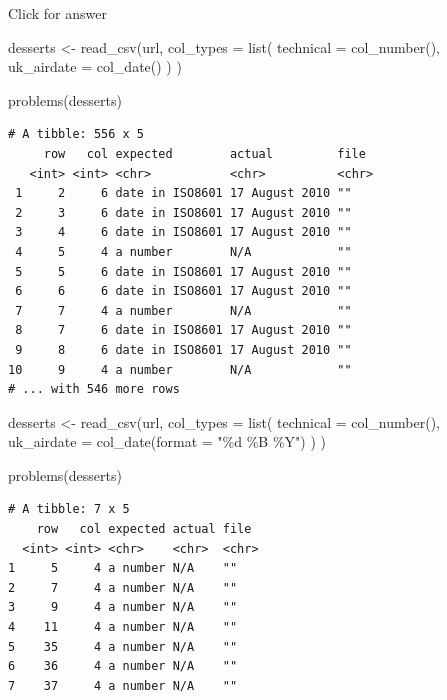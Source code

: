 \documentclass[
]{book}
\newenvironment{Shaded}{\begin{snugshade}}{\end{snugshade}}
\newcommand{\AttributeTok}[1]{\textcolor[rgb]{0.77,0.63,0.00}{#1}}
\newcommand{\FunctionTok}[1]{\textcolor[rgb]{0.00,0.00,0.00}{#1}}
\newcommand{\NormalTok}[1]{#1}
\newcommand{\OtherTok}[1]{\textcolor[rgb]{0.56,0.35,0.01}{#1}}
\newcommand{\StringTok}[1]{\textcolor[rgb]{0.31,0.60,0.02}{#1}}
\begin{document}
Click for answer

\begin{Shaded}
\begin{Highlighting}[]
\NormalTok{desserts }\OtherTok{\textless{}{-}} \FunctionTok{read\_csv}\NormalTok{(url,}
  \AttributeTok{col\_types =} \FunctionTok{list}\NormalTok{(}
    \AttributeTok{technical =} \FunctionTok{col\_number}\NormalTok{(),}
    \AttributeTok{uk\_airdate =} \FunctionTok{col\_date}\NormalTok{()}
\NormalTok{  )}
\NormalTok{)}

\FunctionTok{problems}\NormalTok{(desserts)}
\end{Highlighting}
\end{Shaded}

\begin{verbatim}
# A tibble: 556 x 5
     row   col expected        actual         file 
   <int> <int> <chr>           <chr>          <chr>
 1     2     6 date in ISO8601 17 August 2010 ""   
 2     3     6 date in ISO8601 17 August 2010 ""   
 3     4     6 date in ISO8601 17 August 2010 ""   
 4     5     4 a number        N/A            ""   
 5     5     6 date in ISO8601 17 August 2010 ""   
 6     6     6 date in ISO8601 17 August 2010 ""   
 7     7     4 a number        N/A            ""   
 8     7     6 date in ISO8601 17 August 2010 ""   
 9     8     6 date in ISO8601 17 August 2010 ""   
10     9     4 a number        N/A            ""   
# ... with 546 more rows
\end{verbatim}

\begin{Shaded}
\begin{Highlighting}[]
\NormalTok{desserts }\OtherTok{\textless{}{-}} \FunctionTok{read\_csv}\NormalTok{(url,}
    \AttributeTok{col\_types =} \FunctionTok{list}\NormalTok{(}
    \AttributeTok{technical =} \FunctionTok{col\_number}\NormalTok{(), }
    \AttributeTok{uk\_airdate =} \FunctionTok{col\_date}\NormalTok{(}\AttributeTok{format =} \StringTok{"\%d \%B \%Y"}\NormalTok{)}
\NormalTok{  ) }
\NormalTok{)}

\FunctionTok{problems}\NormalTok{(desserts)}
\end{Highlighting}
\end{Shaded}

\begin{verbatim}
# A tibble: 7 x 5
    row   col expected actual file 
  <int> <int> <chr>    <chr>  <chr>
1     5     4 a number N/A    ""   
2     7     4 a number N/A    ""   
3     9     4 a number N/A    ""   
4    11     4 a number N/A    ""   
5    35     4 a number N/A    ""   
6    36     4 a number N/A    ""   
7    37     4 a number N/A    ""   
\end{verbatim}
\end{document}

